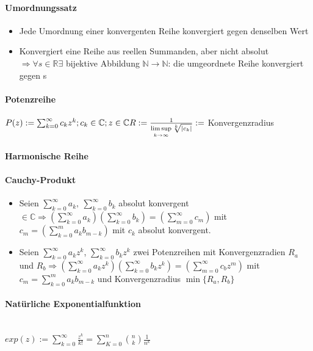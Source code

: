 \documentclass[paper=a3,paper=landscape, fontsize=9pt,DIV=30]{scrartcl}
\newcommand{\real}{{\mathbb{R}}}
\newcommand{\compl}{\mathbb{C}}
\newcommand{\nat}{\mathbb{N}}
\begin{document}
\begin{multicols*}{4}
  \paragraph{Umordnungssatz}\begin{itemize}
  \item Jede Umordnung einer konvergenten Reihe konvergiert gegen denselben Wert
  \item Konvergiert eine Reihe aus reellen Summanden, aber nicht absolut $\Rightarrow \forall s \in \real \exists$ bijektive Abbildung $\nat \rightarrow \nat$: die umgeordnete Reihe konvergiert gegen s
\end{itemize}

  \paragraph{Potenzreihe}
    $ P(z) := \sum_{k=0}^{\infty} c_kz^k; c_k \in \compl; z \in \compl\\R := \frac{1}{\limsup\limits_{k \rightarrow \infty} \sqrt[k]{|c_k|}} :=$ Konvergenzradius

  \paragraph{Harmonische Reihe}

  \paragraph{Cauchy-Produkt}
  \begin{itemize}
  \item Seien $ \sum_{k=0}^{\infty} a_k,\:\sum_{k=0}^{\infty} b_k$ absolut konvergent $ \in \compl \Rightarrow (\sum_{k=0}^{\infty} a_k) (\sum_{k=0}^{\infty} b_k) = (\sum_{m=0}^{\infty} c_m)$ mit $ c_m=(\sum_{k=0}^{m} a_kb_{m-k})$ mit $c_k$ absolut konvergent.

  \item Seien $ \sum_{k=0}^{\infty} a_kz^k$, $\sum_{k=0}^{\infty} b_kz^k$ zwei Potenzreihen mit Konvergenzradien $R_a$ und $ R_b \Rightarrow (\sum_{k=0}^{\infty} a_kz^k)(\sum_{k=0}^{\infty} b_kz^k)=(\sum_{m=0}^{\infty} c_bz^m)$ mit $ c_m = \sum_{k=0}^{m} a_kb_{m-k}$ und Konvergenzradius $\min\{R_a,R_b\}$
  \end{itemize}


  \paragraph{Natürliche Exponentialfunktion}\hspace{0pt} \\
  $ exp(z) := \sum_{k=0}^{\infty} \frac{z^k}{k!} = \sum_{K=0}^{n}\binom{n}{k}\frac{1}{n^k}$



\end{multicols*}
\end{document}
